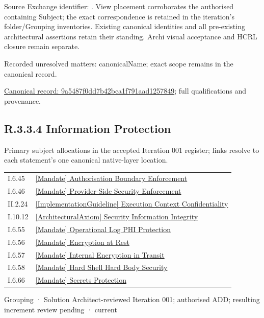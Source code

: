 Source Exchange identifier: \texttt{}. View placement corroborates
the authorised containing Subject; the exact correspondence is retained in the
iteration's folder/Grouping inventories. Existing canonical identities and all
pre-existing architectural assertions retain their standing. Archi visual
acceptance and HCRL closure remain separate.


{\small Recorded unresolved matters: canonicalName; exact scope remains in the canonical record.}\par
{\footnotesize \href{../../../../continuum/grouping/9a5487f0dd7b42bca1f791aad1257849.md}{Canonical record: 9a5487f0dd7b42bca1f791aad1257849}; full qualifications and provenance.}\par
\subsection*{R.3.3.4 Information Protection}
\label{navigation:R.3.3.4}

Primary subject allocations in the accepted Iteration 001 register; links resolve to each statement’s one canonical native-layer location.\par
\begin{longtable}{p{.22\linewidth}p{.73\linewidth}}
I.6.45 & \hyperref[element:e04672ef7f2341b68c09a0348742a861]{[Mandate] Authorisation Boundary Enforcement} \\
I.6.46 & \hyperref[element:d93b50d0abe04c47bf09759627785745]{[Mandate] Provider-Side Security Enforcement} \\
II.2.24 & \hyperref[element:ddc28f789d69433686ef40561fec5750]{[ImplementationGuideline] Execution Context Confidentiality} \\
I.10.12 & \hyperref[element:52083b57c01d4262bf965afa96489136]{[ArchitecturalAxiom] Security Information Integrity} \\
I.6.55 & \hyperref[element:ab99a48c29c14a1883e820baf98b643a]{[Mandate] Operational Log PHI Protection} \\
I.6.56 & \hyperref[element:4522bf0326334607a4a6177c819e61b6]{[Mandate] Encryption at Rest} \\
I.6.57 & \hyperref[element:4b540b55db1b4c1197482d8f29d70e45]{[Mandate] Internal Encryption in Transit} \\
I.6.58 & \hyperref[element:fb7783088c894106a017912467a9e40d]{[Mandate] Hard Shell Hard Body Security} \\
I.6.66 & \hyperref[element:4547bd339ff143c988391159e3407f20]{[Mandate] Secrets Protection} \\
\end{longtable}
\label{element:d2f8fcaac9984a12beab502d1944ea25}
{\small Grouping · Solution Architect-reviewed Iteration 001; authorised ADD; resulting increment review pending · current}\par

